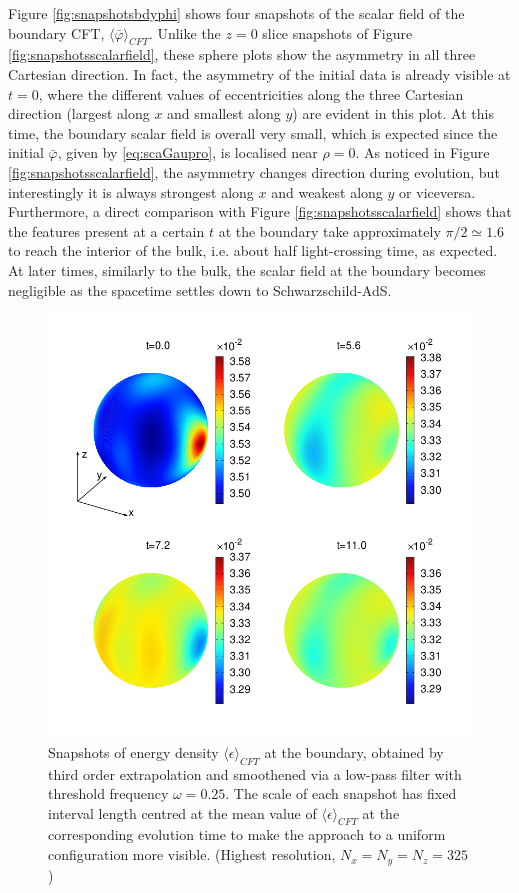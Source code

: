 \documentclass[a4paper,11pt]{article}
\numberwithin{equation}{section}
\begin{document}
Figure \ref{fig:snapshotsbdyphi} shows four snapshots of the scalar field of the boundary CFT, $\langle \bar{\varphi}\rangle_{CFT}$.
Unlike the $z=0$ slice snapshots of Figure \ref{fig:snapshotsscalarfield}, these sphere plots show the asymmetry in all three Cartesian direction. In fact, the asymmetry of the initial data is already visible at $t=0$, where the different values of eccentricities along the three Cartesian direction (largest along $x$ and smallest along $y$) are evident in this plot. At this time, the boundary scalar field is overall very small, which is expected since the initial $\bar{\varphi}$, given by \eqref{eq:scaGaupro}, is localised near $\rho=0$.
As noticed in Figure \ref{fig:snapshotsscalarfield}, the asymmetry changes direction during evolution, but interestingly it is always strongest along $x$ and weakest along $y$ or viceversa. Furthermore, a direct comparison with Figure \ref{fig:snapshotsscalarfield} shows that the features present at a certain $t$ at the boundary take approximately $\pi/2\simeq1.6$ to reach the interior of the bulk, i.e. about half light-crossing time, as expected. At later times, similarly to the bulk, the scalar field at the boundary becomes negligible as the spacetime settles down to Schwarzschild-AdS.

\begin{figure}[!h]
        \centering
        \includegraphics[width=5.0in,clip=true]{plots/bdyplots/L3/bdyenergydensity/sphereplots_bdyenergydensity_L3_2by2.png}
\parbox{5.0in}{\caption{Snapshots of energy density $\langle\epsilon\rangle_{CFT}$ at the boundary, obtained by third order extrapolation and smoothened via a low-pass filter with threshold frequency $\omega=0.25$. The scale of each snapshot has fixed interval length centred at the mean value of  $\langle\epsilon\rangle_{CFT}$ at the corresponding evolution time to make the approach to a uniform configuration more visible. (Highest resolution, $N_x=N_y=N_z=325$)
        }\label{fig:snapshotsenergydensity}}
\end{figure}
\end{document}
